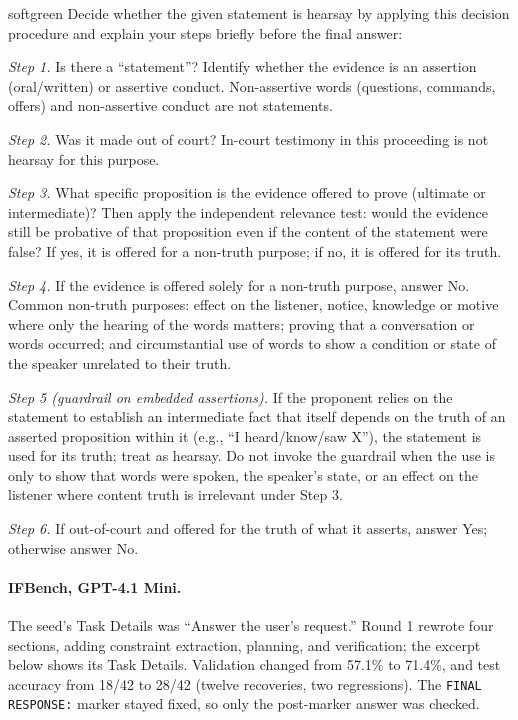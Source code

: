 \documentclass[11pt]{article}
\begin{document}
\begin{promptbox}[title={\textbf{Hearsay: returned Task Details} (round 2 excerpt)},fontupper=\small]{softgreen}
Decide whether the given statement is hearsay by applying this decision procedure and explain your steps
briefly before the final answer:\par
\textit{Step 1.} Is there a ``statement''? Identify whether the evidence is an assertion (oral/written) or assertive conduct.
Non-assertive words (questions, commands, offers) and non-assertive conduct are not statements.\par
\textit{Step 2.} Was it made out of court? In-court testimony in this proceeding is not hearsay for this purpose.\par
\textit{Step 3.} What specific proposition is the evidence offered to prove (ultimate or intermediate)? Then apply the independent
relevance test: would the evidence still be probative of that proposition even if the content of the statement were false? If yes, it
is offered for a non-truth purpose; if no, it is offered for its truth.\par
\textit{Step 4.} If the evidence is offered solely for a non-truth purpose, answer No. Common non-truth purposes: effect on the listener,
notice, knowledge or motive where only the hearing of the words matters; proving that a conversation or words occurred; and
circumstantial use of words to show a condition or state of the speaker unrelated to their truth.\par
\textit{Step 5 (guardrail on embedded assertions).} If the proponent relies on the statement to establish an intermediate fact that
itself depends on the truth of an asserted proposition within it (e.g., ``I heard/know/saw X''), the statement is used for its
truth; treat as hearsay. Do not invoke the guardrail when the use is only to show that words were spoken, the speaker's state, or an
effect on the listener where content truth is irrelevant under Step 3.\par
\textit{Step 6.} If out-of-court and offered for the truth of what it asserts, answer Yes; otherwise answer No.
\end{promptbox}

\paragraph{IFBench, GPT-4.1 Mini.}
The seed's Task Details was ``Answer the user's request.'' Round 1 rewrote four sections, adding constraint extraction,
planning, and verification; the excerpt below shows its Task Details. Validation changed from 57.1\% to 71.4\%, and
test accuracy from 18/42 to 28/42 (twelve recoveries, two regressions). The \texttt{FINAL RESPONSE:} marker stayed fixed,
so only the post-marker answer was checked.
\end{document}
